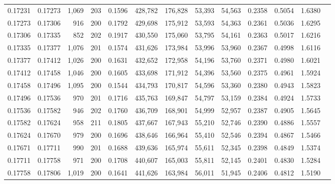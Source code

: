 \begin{tabular}{rrrrrrrrrrrrr}
0.17231 & 0.17273 & 1,069 & 203 &                                     0.1596 & 428,782 & 176,828 &  53,393 &  54,563 & 0.2358 & 0.5054 & 1.6380 \\
0.17273 & 0.17306 &   916 & 200 &                                     0.1792 & 429,698 & 175,912 &  53,593 &  54,363 & 0.2361 & 0.5036 & 1.6295 \\
0.17306 & 0.17335 &   852 & 202 &                                     0.1917 & 430,550 & 175,060 &  53,795 &  54,161 & 0.2363 & 0.5017 & 1.6216 \\
0.17335 & 0.17377 & 1,076 & 201 &                                     0.1574 & 431,626 & 173,984 &  53,996 &  53,960 & 0.2367 & 0.4998 & 1.6116 \\
0.17377 & 0.17412 & 1,026 & 200 &                                     0.1631 & 432,652 & 172,958 &  54,196 &  53,760 & 0.2371 & 0.4980 & 1.6021 \\
0.17412 & 0.17458 & 1,046 & 200 &                                     0.1605 & 433,698 & 171,912 &  54,396 &  53,560 & 0.2375 & 0.4961 & 1.5924 \\
0.17458 & 0.17496 & 1,095 & 200 &                                     0.1544 & 434,793 & 170,817 &  54,596 &  53,360 & 0.2380 & 0.4943 & 1.5823 \\
0.17496 & 0.17536 &   970 & 201 &                                     0.1716 & 435,763 & 169,847 &  54,797 &  53,159 & 0.2384 & 0.4924 & 1.5733 \\
0.17536 & 0.17582 &   946 & 202 &                                     0.1760 & 436,709 & 168,901 &  54,999 &  52,957 & 0.2387 & 0.4905 & 1.5645 \\
0.17582 & 0.17624 &   958 & 211 &                                     0.1805 & 437,667 & 167,943 &  55,210 &  52,746 & 0.2390 & 0.4886 & 1.5557 \\
0.17624 & 0.17670 &   979 & 200 &                                     0.1696 & 438,646 & 166,964 &  55,410 &  52,546 & 0.2394 & 0.4867 & 1.5466 \\
0.17671 & 0.17711 &   990 & 201 &                                     0.1688 & 439,636 & 165,974 &  55,611 &  52,345 & 0.2398 & 0.4849 & 1.5374 \\
0.17711 & 0.17758 &   971 & 200 &                                     0.1708 & 440,607 & 165,003 &  55,811 &  52,145 & 0.2401 & 0.4830 & 1.5284 \\
0.17758 & 0.17806 & 1,019 & 200 &                                     0.1641 & 441,626 & 163,984 &  56,011 &  51,945 & 0.2406 & 0.4812 & 1.5190 \\

\end{tabular}
